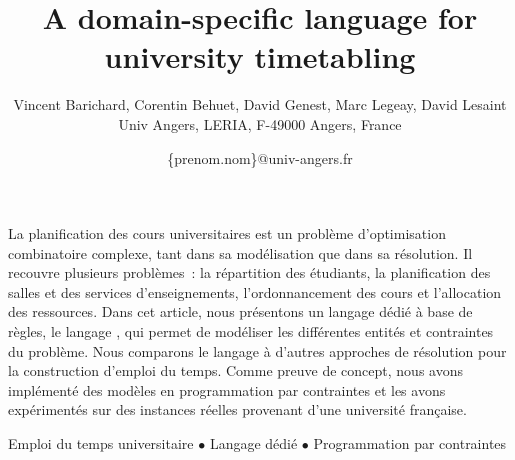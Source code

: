 \documentclass[french]{pfia}
\title{\textbf{
A domain-specific language for university timetabling
}}
\author{Vincent Barichard, Corentin Behuet, David Genest, Marc Legeay, David Lesaint\\[6pt]
Univ Angers, LERIA, F-49000 Angers, France \\
}
\date{
\{prenom.nom\}@univ-angers.fr
}
\begin{document}
\maketitle


\begin{resume}

La planification des cours universitaires est un problème d'optimisation combinatoire complexe, tant dans sa modélisation que dans sa résolution.
Il recouvre plusieurs problèmes~: la répartition des étudiants, la planification des salles et des services d'enseignements, l'ordonnancement des cours et l'allocation des ressources.
Dans cet article, nous présentons un langage dédié à base de règles, le langage \UTP{}, qui permet de modéliser les différentes entités et contraintes du problème.
Nous comparons le langage \UTP{} à d'autres approches de résolution pour la construction d'emploi du temps.
Comme preuve de concept, nous avons implémenté des modèles en programmation par contraintes et les avons expérimentés sur des instances réelles provenant d'une université française.
\end{resume}

\begin{motscles}
Emploi du temps universitaire $\bullet$ Langage dédié $\bullet$ Programmation par contraintes 
\end{motscles}

\end{document}
